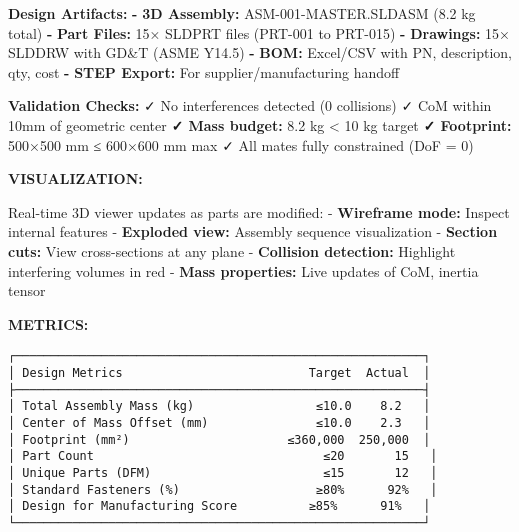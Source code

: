\documentclass[
]{article}
\newenvironment{Shaded}{\begin{snugshade}}{\end{snugshade}}
\newcommand{\AttributeTok}[1]{\textcolor[rgb]{0.13,0.29,0.53}{#1}}
\newcommand{\FunctionTok}[1]{\textcolor[rgb]{0.13,0.29,0.53}{\textbf{#1}}}
\newcommand{\KeywordTok}[1]{\textcolor[rgb]{0.13,0.29,0.53}{\textbf{#1}}}
\begin{document}
\begin{Shaded}
\begin{Highlighting}[]
\FunctionTok{Design Artifacts}\KeywordTok{:}
\AttributeTok{  }\KeywordTok{{-}}\AttributeTok{ }\FunctionTok{3D Assembly}\KeywordTok{:}\AttributeTok{ ASM{-}001{-}MASTER.SLDASM (8.2 kg total)}
\AttributeTok{  }\KeywordTok{{-}}\AttributeTok{ }\FunctionTok{Part Files}\KeywordTok{:}\AttributeTok{ 15× SLDPRT files (PRT{-}001 to PRT{-}015)}
\AttributeTok{  }\KeywordTok{{-}}\AttributeTok{ }\FunctionTok{Drawings}\KeywordTok{:}\AttributeTok{ 15× SLDDRW with GD\&T (ASME Y14.5)}
\AttributeTok{  }\KeywordTok{{-}}\AttributeTok{ }\FunctionTok{BOM}\KeywordTok{:}\AttributeTok{ Excel/CSV with PN, description, qty, cost}
\AttributeTok{  }\KeywordTok{{-}}\AttributeTok{ }\FunctionTok{STEP Export}\KeywordTok{:}\AttributeTok{ For supplier/manufacturing handoff}

\FunctionTok{Validation Checks}\KeywordTok{:}
\AttributeTok{  ✓ No interferences detected (0 collisions)}
\AttributeTok{  ✓ CoM within 10mm of geometric center}
\AttributeTok{  }\FunctionTok{✓ Mass budget}\KeywordTok{:}\AttributeTok{ 8.2 kg \textless{} 10 kg target}
\AttributeTok{  }\FunctionTok{✓ Footprint}\KeywordTok{:}\AttributeTok{ 500×500 mm ≤ 600×600 mm max}
\AttributeTok{  ✓ All mates fully constrained (DoF = 0)}
\end{Highlighting}
\end{Shaded}

\textbf{VISUALIZATION:}

Real-time 3D viewer updates as parts are modified: - \textbf{Wireframe
mode:} Inspect internal features - \textbf{Exploded view:} Assembly
sequence visualization - \textbf{Section cuts:} View cross-sections at
any plane - \textbf{Collision detection:} Highlight interfering volumes
in red - \textbf{Mass properties:} Live updates of CoM, inertia tensor

\textbf{METRICS:}

\begin{verbatim}
┌─────────────────────────────────────────────────────────┐
│ Design Metrics                          Target  Actual  │
├─────────────────────────────────────────────────────────┤
│ Total Assembly Mass (kg)                 ≤10.0    8.2   │
│ Center of Mass Offset (mm)               ≤10.0    2.3   │
│ Footprint (mm²)                      ≤360,000  250,000  │
│ Part Count                                ≤20       15   │
│ Unique Parts (DFM)                        ≤15       12   │
│ Standard Fasteners (%)                   ≥80%      92%   │
│ Design for Manufacturing Score          ≥85%      91%   │
└─────────────────────────────────────────────────────────┘
\end{verbatim}
\end{document}
